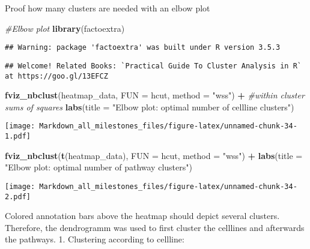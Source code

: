 \documentclass[]{article}
\newenvironment{Shaded}{\begin{snugshade}}{\end{snugshade}}
\newcommand{\CommentTok}[1]{\textcolor[rgb]{0.56,0.35,0.01}{\textit{#1}}}
\newcommand{\DataTypeTok}[1]{\textcolor[rgb]{0.13,0.29,0.53}{#1}}
\newcommand{\KeywordTok}[1]{\textcolor[rgb]{0.13,0.29,0.53}{\textbf{#1}}}
\newcommand{\NormalTok}[1]{#1}
\newcommand{\OperatorTok}[1]{\textcolor[rgb]{0.81,0.36,0.00}{\textbf{#1}}}
\newcommand{\StringTok}[1]{\textcolor[rgb]{0.31,0.60,0.02}{#1}}
\begin{document}
Proof how many clusters are needed with an elbow plot

\begin{Shaded}
\begin{Highlighting}[]
\CommentTok{#Elbow plot}
\KeywordTok{library}\NormalTok{(factoextra)}
\end{Highlighting}
\end{Shaded}

\begin{verbatim}
## Warning: package 'factoextra' was built under R version 3.5.3
\end{verbatim}

\begin{verbatim}
## Welcome! Related Books: `Practical Guide To Cluster Analysis in R` at https://goo.gl/13EFCZ
\end{verbatim}

\begin{Shaded}
\begin{Highlighting}[]
\KeywordTok{fviz_nbclust}\NormalTok{(heatmap_data, }
             \DataTypeTok{FUN =}\NormalTok{ hcut, }
             \DataTypeTok{method =} \StringTok{"wss"}\NormalTok{) }\OperatorTok{+}\StringTok{ }\CommentTok{#within cluster sums of squares}
\StringTok{  }\KeywordTok{labs}\NormalTok{(}\DataTypeTok{title =} \StringTok{"Elbow plot: optimal number of cellline clusters"}\NormalTok{)}
\end{Highlighting}
\end{Shaded}

\texttt{[image: Markdown\_all\_milestones\_files/figure-latex/unnamed-chunk-34-1.pdf]}

\begin{Shaded}
\begin{Highlighting}[]
\KeywordTok{fviz_nbclust}\NormalTok{(}\KeywordTok{t}\NormalTok{(heatmap_data), }
             \DataTypeTok{FUN =}\NormalTok{ hcut, }
             \DataTypeTok{method =} \StringTok{"wss"}\NormalTok{) }\OperatorTok{+}
\StringTok{  }\KeywordTok{labs}\NormalTok{(}\DataTypeTok{title =} \StringTok{"Elbow plot: optimal number of pathway clusters"}\NormalTok{)}
\end{Highlighting}
\end{Shaded}

\texttt{[image: Markdown\_all\_milestones\_files/figure-latex/unnamed-chunk-34-2.pdf]}

Colored annotation bars above the heatmap should depict several
clusters. Therefore, the dendrogramm was used to first cluster the
celllines and afterwards the pathways. 1. Clustering according to
cellline:
\end{document}
